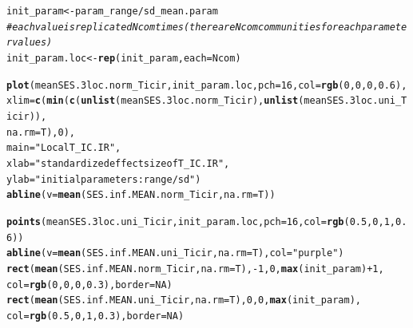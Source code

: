 \documentclass[12pt]{article}\usepackage[]{graphicx}\usepackage[]{color}
\makeatletter
\newcommand{\hlnum}[1]{\textcolor[rgb]{0.686,0.059,0.569}{#1}}%
\newcommand{\hlstr}[1]{\textcolor[rgb]{0.192,0.494,0.8}{#1}}%
\newcommand{\hlcom}[1]{\textcolor[rgb]{0.678,0.584,0.686}{\textit{#1}}}%
\newcommand{\hlopt}[1]{\textcolor[rgb]{0,0,0}{#1}}%
\newcommand{\hlstd}[1]{\textcolor[rgb]{0.345,0.345,0.345}{#1}}%
\newcommand{\hlkwb}[1]{\textcolor[rgb]{0.69,0.353,0.396}{#1}}%
\newcommand{\hlkwc}[1]{\textcolor[rgb]{0.333,0.667,0.333}{#1}}%
\newcommand{\hlkwd}[1]{\textcolor[rgb]{0.737,0.353,0.396}{\textbf{#1}}}%
\newenvironment{kframe}{%
 \def\at@end@of@kframe{}%
 \ifinner\ifhmode%
  \def\at@end@of@kframe{\end{minipage}}%
  \begin{minipage}{\columnwidth}%
 \fi\fi%
 \def\FrameCommand##1{\hskip\@totalleftmargin \hskip-\fboxsep
 \colorbox{shadecolor}{##1}\hskip-\fboxsep
     \hskip-\linewidth \hskip-\@totalleftmargin \hskip\columnwidth}%
 \MakeFramed {\advance\hsize-\width
   \@totalleftmargin\z@ \linewidth\hsize
   \@setminipage}}%
 {\par\unskip\endMakeFramed%
 \at@end@of@kframe}
\newenvironment{knitrout}{}{} %
\makeatother
\begin{document}
\begin{knitrout}\small
{}\color{fgcolor}\begin{kframe}
\begin{alltt}
\hlstd{init_param} \hlkwb{<-} \hlstd{param_range} \hlopt{/} \hlstd{sd_mean.param}
\hlcom{#each value is replicated Ncom times (there are Ncom communities for each parameter values)}
\hlstd{init_param.loc} \hlkwb{<-} \hlkwd{rep}\hlstd{(init_param,} \hlkwc{each} \hlstd{= Ncom)}

\hlkwd{plot}\hlstd{(meanSES.3loc.norm_Ticir, init_param.loc,} \hlkwc{pch} \hlstd{=} \hlnum{16}\hlstd{,} \hlkwc{col} \hlstd{=} \hlkwd{rgb}\hlstd{(}\hlnum{0}\hlstd{,} \hlnum{0}\hlstd{,} \hlnum{0}\hlstd{,} \hlnum{0.6}\hlstd{),}
     \hlkwc{xlim} \hlstd{=} \hlkwd{c}\hlstd{(}\hlkwd{min}\hlstd{(}\hlkwd{c}\hlstd{(}\hlkwd{unlist}\hlstd{(meanSES.3loc.norm_Ticir),} \hlkwd{unlist}\hlstd{(meanSES.3loc.uni_Ticir)),}
     \hlkwc{na.rm} \hlstd{= T),} \hlnum{0}\hlstd{),}
     \hlkwc{main} \hlstd{=} \hlstr{"Local T_IC.IR"}\hlstd{,}
     \hlkwc{xlab} \hlstd{=} \hlstr{"standardized effect size of T_IC.IR"}\hlstd{,}
     \hlkwc{ylab} \hlstd{=} \hlstr{"initial parameters: range/sd"}\hlstd{)}
\hlkwd{abline}\hlstd{(}\hlkwc{v} \hlstd{=} \hlkwd{mean}\hlstd{(SES.inf.MEAN.norm_Ticir,} \hlkwc{na.rm} \hlstd{= T))}

\hlkwd{points}\hlstd{(meanSES.3loc.uni_Ticir, init_param.loc,} \hlkwc{pch} \hlstd{=} \hlnum{16}\hlstd{,} \hlkwc{col} \hlstd{=} \hlkwd{rgb}\hlstd{(}\hlnum{0.5}\hlstd{,} \hlnum{0}\hlstd{,} \hlnum{1}\hlstd{,} \hlnum{0.6}\hlstd{))}
\hlkwd{abline}\hlstd{(}\hlkwc{v} \hlstd{=} \hlkwd{mean}\hlstd{(SES.inf.MEAN.uni_Ticir,} \hlkwc{na.rm} \hlstd{= T),} \hlkwc{col} \hlstd{=} \hlstr{"purple"}\hlstd{)}
\hlkwd{rect}\hlstd{(}\hlkwd{mean}\hlstd{(SES.inf.MEAN.norm_Ticir,} \hlkwc{na.rm} \hlstd{= T),} \hlopt{-}\hlnum{1}\hlstd{,} \hlnum{0}\hlstd{,} \hlkwd{max}\hlstd{(init_param)} \hlopt{+} \hlnum{1}\hlstd{,}
     \hlkwc{col} \hlstd{=} \hlkwd{rgb}\hlstd{(}\hlnum{0}\hlstd{,} \hlnum{0}\hlstd{,} \hlnum{0}\hlstd{,} \hlnum{0.3}\hlstd{),} \hlkwc{border} \hlstd{=} \hlnum{NA}\hlstd{)}
\hlkwd{rect}\hlstd{(}\hlkwd{mean}\hlstd{(SES.inf.MEAN.uni_Ticir,} \hlkwc{na.rm} \hlstd{= T),}\hlnum{0}\hlstd{,} \hlnum{0}\hlstd{,} \hlkwd{max}\hlstd{(init_param),}
     \hlkwc{col} \hlstd{=} \hlkwd{rgb}\hlstd{(}\hlnum{0.5}\hlstd{,} \hlnum{0}\hlstd{,} \hlnum{1}\hlstd{,} \hlnum{0.3}\hlstd{),} \hlkwc{border} \hlstd{=} \hlnum{NA}\hlstd{)}
\end{alltt}
\end{kframe}\begin{figure}


\end{figure}
\end{knitrout}
\end{document}
